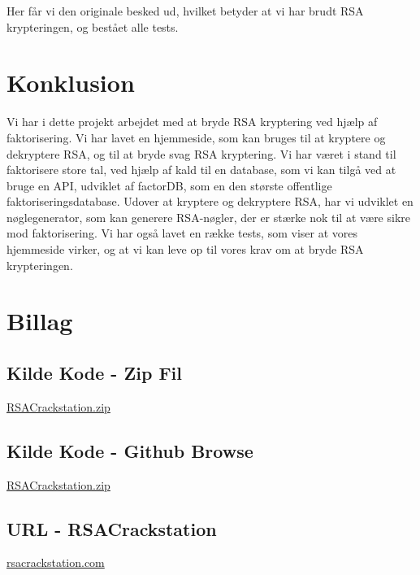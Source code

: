 \documentclass[a4paper,12pt]{extarticle}
\begin{document}
    Her får vi den originale besked ud, hvilket betyder at vi har brudt RSA krypteringen, og bestået alle tests.


    \section{Konklusion}\label{sec:konklusion}
    Vi har i dette projekt arbejdet med at bryde RSA kryptering ved hjælp af faktorisering.
    Vi har lavet en hjemmeside, som kan bruges til at kryptere og dekryptere RSA, og til at bryde svag RSA kryptering.
    Vi har været i stand til faktorisere store tal, ved hjælp af kald til en database,
    som vi kan tilgå ved at bruge en API, udviklet af factorDB, som en den største offentlige faktoriseringsdatabase.
    Udover at kryptere og dekryptere RSA, har vi udviklet en nøglegenerator, som kan generere RSA-nøgler,
    der er stærke nok til at være sikre mod faktorisering.
    Vi har også lavet en række tests, som viser at vores hjemmeside virker,
    og at vi kan leve op til vores krav om at bryde RSA krypteringen.


    \section{Billag}\label{sec:billag}
    \subsection{Kilde Kode - Zip Fil}\label{subsec:billag-source-code}
    \href{https://github.com/Zymat-dk/RSACrackstation/archive/refs/heads/main.zip}{RSACrackstation.zip}
    \subsection{Kilde Kode - Github Browse}\label{subsec:billag-github}
    \href{https://github.com/Zymat-dk/RSACrackstation}{RSACrackstation.zip}
    \subsection{URL - RSACrackstation}\label{subsec:billag-url}
    \href{https://rsacrackstation.com}{rsacrackstation.com}
\end{document}
